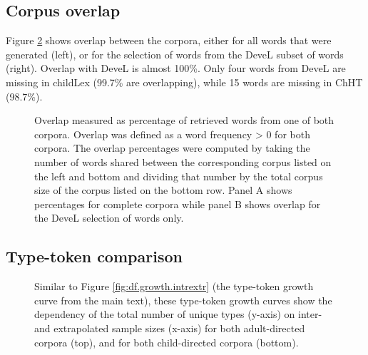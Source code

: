 \documentclass[manuscript]{stjour}
\begin{document}
\begin{figure}[!htbp]
    \label{fig:combined_hist_all4}
\end{figure}

\clearpage


\subsection{Corpus overlap}

Figure \ref{fig:heatmaps} shows overlap between the corpora, either for all words that were generated (left), or for the selection of words from the DeveL subset of words (right). Overlap with DeveL is almost 100\%. Only four words from DeveL are missing in childLex (99.7\% are overlapping), while 15 words are missing in ChHT (98.7\%).

\begin{figure}[!htbp]
    \caption{Overlap measured as percentage of retrieved words from one of both corpora. Overlap was defined as a word frequency > 0 for both corpora. The overlap percentages were computed by taking the number of words shared between the corresponding corpus listed on the left and bottom and dividing that number by the total corpus size of the corpus listed on the bottom row. Panel A shows percentages for complete corpora while panel B shows overlap for the DeveL selection of words only.}
    \label{fig:heatmaps}
\end{figure}

\clearpage


\subsection{Type-token comparison}

\begin{figure}[!htbp]
    \caption{Similar to Figure \ref{fig:df.growth.intrextr} (the type-token growth curve from the main text), these type-token growth curves show the dependency of the total number of unique types (y-axis) on inter- and extrapolated sample sizes (x-axis) for both adult-directed corpora (top), and for both child-directed corpora (bottom).}
    \label{fig:df.growth.intrextr2}
  \hfill
\end{figure}
\end{document}
